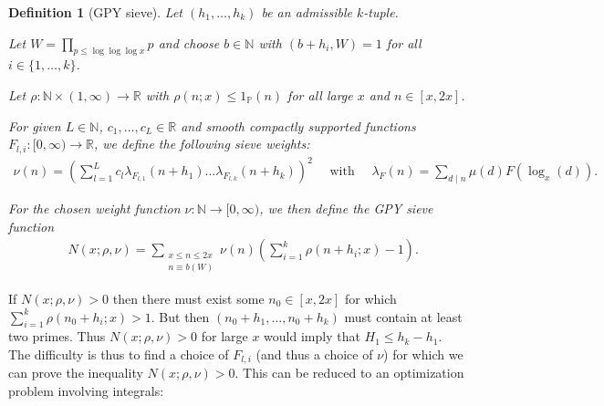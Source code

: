 \documentclass{amsart}
\newtheorem{defn}{Definition}
\numberwithin{equation}{section}
\begin{document}
\begin{defn}[GPY sieve]\label{def:gpysieve}
Let $(h_1, \dots, h_k)$ be an admissible $k$-tuple. 

Let $W= \prod_{p \leq \log\log\log x} p$ and choose $b \in \mathbb{N}$ with  $(b+h_i,W)=1$ for all $i \in \{1,\dots,k\}$. 

Let $\rho: \mathbb{N} \times (1,\infty) \rightarrow \mathbb{R}$ with $\rho(n;x) \leq 1_{\mathbb{P}}(n)$ for all large $x$ and $n \in [x,2x]$.

\medskip

For given $L \in \mathbb{N}$, $c_1, \dots, c_L \in \mathbb{R}$ and  smooth compactly supported functions $F_{l,i}:[0,\infty) \rightarrow \mathbb{R}$, we define the following sieve weights:
\begin{align*}
\nu(n)=\left(\sum_{l=1}^L c_l \lambda_{F_{l,1}}(n+h_1) \dots \lambda_{F_{l,k}}(n+h_k) \right)^2  \quad \mbox{ with  }  \quad \lambda_F(n)=\sum_{d \mid n } \mu(d) F(\log_x(d)).
\end{align*} 


For the chosen weight function $\nu: \mathbb{N} \rightarrow [0,\infty)$, we then define the GPY sieve function
\begin{align*}
&N(x;\rho,\nu)=  \sum_{\substack{x \leq n \leq 2x \\  n \equiv b(W) }} \nu(n) \left( \sum_{i=1}^k \rho(n+h_i;x) - 1 \right).
\end{align*}
\end{defn}
If $N(x;\rho,\nu) >0$ then there must exist some $n_0 \in [x,2x]$  for which $\sum_{i=1}^k \rho(n_0+h_i;x) > 1 $. But then    $(n_0+h_1, \dots, n_0+h_k)$ must contain at least two primes. Thus $N(x;\rho,\nu) > 0$ for large $x$ would imply that $H_1 \leq h_k - h_1$. The difficulty is thus  to find a choice of $F_{l,i}$ (and thus a choice of $\nu$) for which we can prove the inequality $N(x;\rho,\nu) > 0$. This can be reduced to an optimization problem involving integrals:
\end{document}
